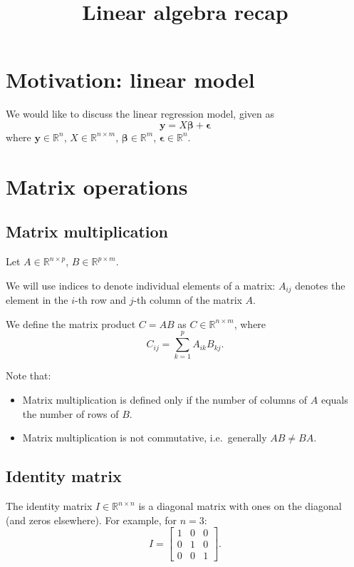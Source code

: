 \documentclass{article}
\title{Linear algebra recap}
\date{}
\theoremstyle{remark}
\theoremstyle{definition}
\begin{document}
	
	\maketitle
	\section*{Motivation: linear model}
	We would like to discuss the linear regression model, given as
	$$
	\bm{y} = X\bm{\beta} + \bm{\epsilon}
	$$
	where $\bm{y} \in \mathbb{R}^n$, $X \in \mathbb{R}^{n \times m}$, $\bm{\beta} \in \mathbb{R}^m$, $\bm{\epsilon} \in \mathbb{R}^n$.
	
	\section*{Matrix operations}
	
	
	\subsection*{Matrix multiplication}
	
	Let $A \in \mathbb{R}^{n \times p}$, $B \in \mathbb{R}^{p \times m}$.
	
	We will use indices to denote individual elements of a matrix: $A_{ij}$ denotes the element in the $i$-th row and $j$-th column of the matrix $A$.
	
	We define the matrix product $C = AB$ as $C \in \mathbb{R}^{n \times m}$, where
	$$
	C_{ij} = \sum_{k=1}^{p} A_{ik} B_{kj}.
	$$
	
	Note that:
	\begin{itemize}
		\item Matrix multiplication is defined only if the number of columns of $A$ equals the number of rows of $B$.
		\item Matrix multiplication is not commutative, i.e.\ generally $AB \neq BA$.
	\end{itemize}
	
	\subsection*{Identity matrix}
	
	The identity matrix $I \in \mathbb{R}^{n \times n}$ is a diagonal matrix with ones on the diagonal (and zeros elsewhere). For example, for $n=3$:
	$$
	I = 
	\begin{bmatrix}
		1 & 0 & 0 \\
		0 & 1 & 0 \\
		0 & 0 & 1
	\end{bmatrix}.
	$$
	
\end{document}
